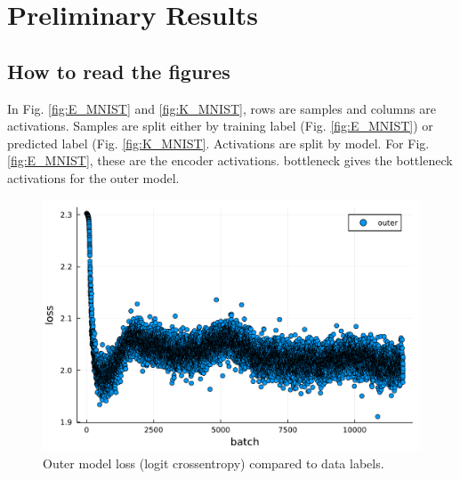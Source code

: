 \section{Preliminary Results}
\label{app:results}

\subsection{How to read the figures}
\label{sec:heatmaps}
In Fig. \ref{fig:E_MNIST} and \ref{fig:K_MNIST}, rows are samples and columns are activations.
Samples are split either by training label (Fig. \ref{fig:E_MNIST}) or predicted label (Fig. \ref{fig:K_MNIST}.
Activations are split by model.
For Fig. \ref{fig:E_MNIST}, these are the encoder activations.
\textsf{bottleneck} gives the bottleneck activations for the outer model.

\begin{figure}{\textwidth}
\centering
\includegraphics[width=\textwidth]{fig/loss_outer.pdf}
\caption{Outer model loss (logit crossentropy) compared to data labels.}
\label{fig:lossouter}
\end{figure}

